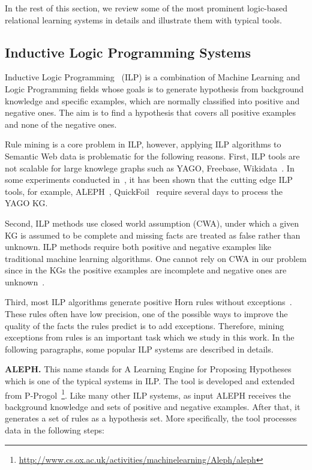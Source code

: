 In the rest of this section, we review some of the most prominent logic-based relational learning systems in details and illustrate them with typical tools.

\subsection{Inductive Logic Programming Systems}

Inductive Logic Programming~\cite{ref9} (ILP) is a combination of Machine Learning and Logic Programming fields whose goals is to generate hypothesis from background knowledge and specific examples, which are normally classified into positive and negative ones. The aim is to find a hypothesis that covers all positive examples and none of the negative ones.

Rule mining is a core problem in ILP, however, applying ILP algorithms to Semantic Web data is problematic for the following reasons. First, ILP tools are not scalable for large knowlege graphs such as YAGO, Freebase, Wikidata~\cite{ref10}. In some experiments conducted in~\cite{ref10}, it has been shown that the cutting edge ILP tools, for example, ALEPH~\cite{ref14, ref10}, QuickFoil~\cite{ref15, ref10} require several days to process the YAGO KG.

Second, ILP methods use closed world assumption (CWA), under which a given KG is assumed to be complete and missing facts are treated as false rather than unknown. ILP methods require both positive and negative examples like traditional machine learning algorithms. One cannot rely on CWA in our problem since in the KGs the positive examples are incomplete and negative ones are unknown~\cite{ref10}.

Third, most ILP algorithms generate positive Horn rules without exceptions~\cite{ref11}. These rules often have low precision, one of the possible ways to improve the quality of the facts the rules predict is to add exceptions. Therefore, mining exceptions from rules is an important task which we study in this work. In the following paragraphs, some popular ILP systems are described in details.

\textbf{ALEPH.} This name stands for A Learning Engine for Proposing Hypotheses which is one of the typical systems in ILP. The tool is developed and extended from P-Progol~\footnote{\url{http://www.cs.ox.ac.uk/activities/machinelearning/Aleph/aleph}}. Like many other ILP systems, as input ALEPH receives the background knowledge and sets of positive and negative examples. After that, it generates a set of rules as a hypothesis set. More specifically, the tool processes data in the following steps:

